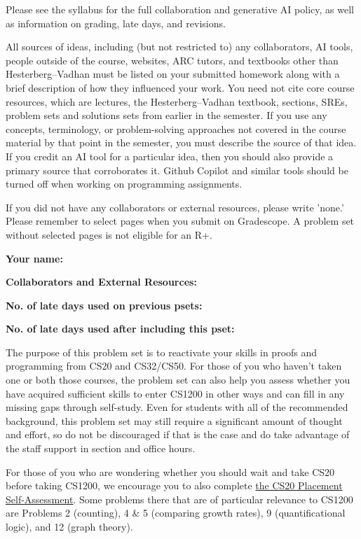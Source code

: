 \documentclass[11pt]{article}
\begin{document}

Please see the syllabus for the full collaboration and generative AI policy, as well as information on grading, late days, and revisions.

All sources of ideas, including (but not restricted to) any collaborators, AI tools, people outside of the course, websites, ARC tutors, and textbooks other than Hesterberg--Vadhan must be listed on your submitted homework along with a brief description of how they influenced your work. You need not cite core course resources, which are lectures, the Hesterberg--Vadhan textbook, sections, SREs, problem sets and solutions sets from earlier in the semester. If you use any concepts, terminology, or problem-solving approaches not covered in the course material by that point in the semester, you must describe the source of that idea. If you credit an AI tool for a particular idea, then you should also provide a primary source that corroborates it. Github Copilot and similar tools should be turned off when working on programming assignments.

If you did not have any collaborators or external resources, please write 'none.' Please remember to select pages when you submit on Gradescope. A problem set without selected pages is not eligible for an R+. 
\newline

\textbf{Your name: }

\textbf{Collaborators and External Resources:}

\textbf{No. of late days used on previous psets: }

\textbf{No. of late days used after including this pset: }

\vspace{1em}

The purpose of this problem set is to reactivate your skills in proofs and programming from CS20 and CS32/CS50. For those of you who haven't taken one or both those courses, the problem set can also help you assess whether you have acquired sufficient skills to enter CS1200 in other ways and can fill in any missing gaps through self-study. Even for students with all of the recommended background, this problem set may still require a significant amount of thought and effort, so do not be discouraged if that is the case and do take advantage of the staff support in section and office hours. 

For those of you who are wondering whether you should wait and take CS20 before taking CS1200, we encourage you to also complete  \href{https://drive.google.com/file/d/1QIJR6sb9hfkK67PhpQaK9KQBzYwzXvsW/view}{the CS20 Placement Self-Assessment}.  Some problems there that are of particular relevance to CS1200 are Problems 2 (counting), 4 \& 5 (comparing growth rates), 9 (quantificational logic), and 12 (graph theory). 
\end{document}
